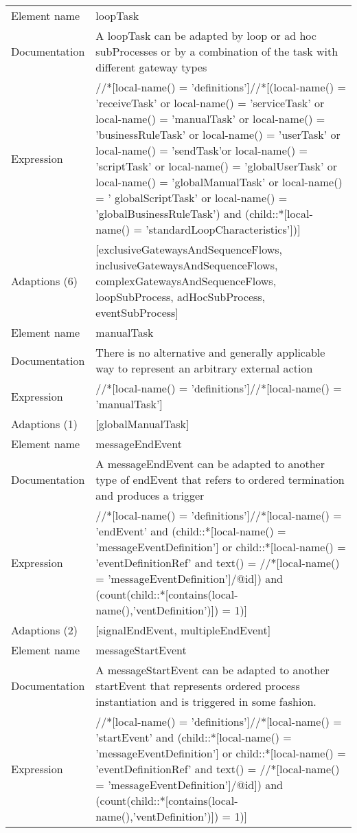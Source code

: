 \begin{center}
\begin{tiny}
\begin{longtable}{p{}|p{}}
\midrule
Element name & loopTask\\
\myrowcolour
Documentation &A loopTask can be adapted by loop or ad hoc subProcesses or by a combination of the task with different gateway types\\
Expression & //*[local-name() = 'definitions']//*[(local-name() = 'receiveTask' or local-name() = 'serviceTask' or local-name() = 'manualTask' or local-name() = 'businessRuleTask' or local-name() = 'userTask' or local-name() = 'sendTask'or local-name() = 'scriptTask'  or local-name() = 'globalUserTask' or local-name() = 'globalManualTask' or local-name() = ' globalScriptTask' or local-name() = 'globalBusinessRuleTask') and (child::*[local-name() = 'standardLoopCharacteristics'])]\\
\myrowcolour
Adaptions (6) & [exclusiveGatewaysAndSequenceFlows, inclusiveGatewaysAndSequenceFlows, complexGatewaysAndSequenceFlows, loopSubProcess, adHocSubProcess, eventSubProcess]\\
\midrule
Element name & manualTask\\
\myrowcolour
Documentation &There is no alternative and generally applicable way to represent an arbitrary external action\\
Expression & //*[local-name() = 'definitions']//*[local-name() = 'manualTask']\\
\myrowcolour
Adaptions (1) & [globalManualTask]\\
\midrule
Element name & messageEndEvent\\
\myrowcolour
Documentation &A messageEndEvent can be adapted to another type of endEvent that refers to ordered termination and produces a trigger\\
Expression & //*[local-name() = 'definitions']//*[local-name() = 'endEvent' and (child::*[local-name() = 'messageEventDefinition'] or child::*[local-name() = 'eventDefinitionRef' and text() = //*[local-name() = 'messageEventDefinition']/@id]) and (count(child::*[contains(local-name(),'ventDefinition')]) = 1)]\\
\myrowcolour
Adaptions (2) & [signalEndEvent, multipleEndEvent]\\
\midrule
Element name & messageStartEvent\\
\myrowcolour
Documentation &A messageStartEvent can be adapted to another startEvent that represents ordered process instantiation and is triggered in some fashion.\\
Expression & //*[local-name() = 'definitions']//*[local-name() = 'startEvent' and (child::*[local-name() = 'messageEventDefinition'] or child::*[local-name() = 'eventDefinitionRef' and text() = //*[local-name() = 'messageEventDefinition']/@id]) and (count(child::*[contains(local-name(),'ventDefinition')]) = 1)]\\

\end{longtable}
\end{tiny}
\end{center}
